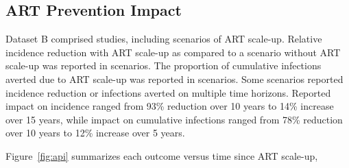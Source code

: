 \subsection{ART Prevention Impact}
\label{ss:res:api}
Dataset B comprised  studies,
including  scenarios of ART scale-up.
Relative incidence reduction with ART scale-up
as compared to a scenario without ART scale-up
was reported in  scenarios.
The proportion of cumulative infections averted due to ART scale-up
was reported in  scenarios.
Some scenarios reported incidence reduction or infections averted
on multiple time horizons. %
Reported impact on incidence ranged from %
93\% reduction over 10 years\cite{Granich2009} to
14\% increase over 15 years,\cite{Salomon2005}
while impact on cumulative infections ranged from
78\% reduction over 10 years\cite{Abbas2006} to
12\% increase over 5 years.\cite{Barnighausen2016}
\par
Figure~\ref{fig:api} summarizes each outcome 
versus time since ART scale-up,
